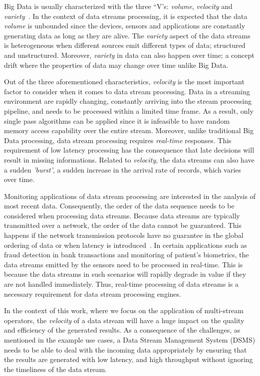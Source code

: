 Big Data is usually characterized with the three “V's: \emph{volume}, \emph{velocity} 
and \emph{variety}~\cite{big_data_analytics}.
In the context of data streams processing, it is expected that the data \emph{volume} 
is unbounded since the devices, sensors and applications are constantly 
generating data as long as they are alive. The \emph{variety} aspect of the 
data streams is heterogeneous when different sources 
emit different types of data; structured and unstructured. 
Moreover, \emph{variety} in data can also happen over time; a concept drift where 
the properties of data may change over time unlike Big Data. 


Out of the three aforementioned characteristics, \emph{velocity} is the most important 
factor to consider when it comes to data stream processing. Data in a streaming 
environment are rapidly changing, constantly arriving into the stream processing
pipeline, and needs to be processed within a limited time frame.
As a result, only single pass algorithms can
be applied since it is infeasible to have random memory access capability
over the entire stream. Moreover, unlike traditional Big Data processing, 
data stream processing requires \emph{real-time} responses. 
This requirement of low latency processing has the consequence 
that late decisions will result in missing informations. Related to \emph{velocity}, 
the data streams can also have a sudden \emph{'burst'}, a sudden increase in the arrival rate of 
records, which varies over time. 

Monitoring applications of data stream processing are interested in the analysis of 
most recent data. Consequently, the order of the data sequence needs to be considered 
when processing data streams. 
Because data streams are typically transmitted over a 
network, the order of the data cannot be guaranteed. This happens if the network
transmission protocols have no guarantee in the global 
ordering of data or when latency is introduced~\cite{requirements_dsp}. 
In certain applications such as fraud detection in bank transactions and monitoring of 
patient's biometrics, the data streams emitted by the sensors need to be processed in 
real-time. This is because the data streams in such scenarios will rapidly degrade in 
value if they are not handled immediately. Thus, real-time processing of data streams 
is a necessary requirement for data stream processing engines. 

In the context of this work, where we focus on the application of multi-stream operators, 
the \emph{velocity} of a data stream will have a huge impact on the quality and efficiency of 
the generated results. As a consequence of the challenges, as mentioned in 
the example use cases, a Data Stream Management System (DSMS) needs 
to be able to deal with the incoming data appropriately by ensuring that the results are generated 
with low latency, and high throughput without ignoring the timeliness of the data stream.  

